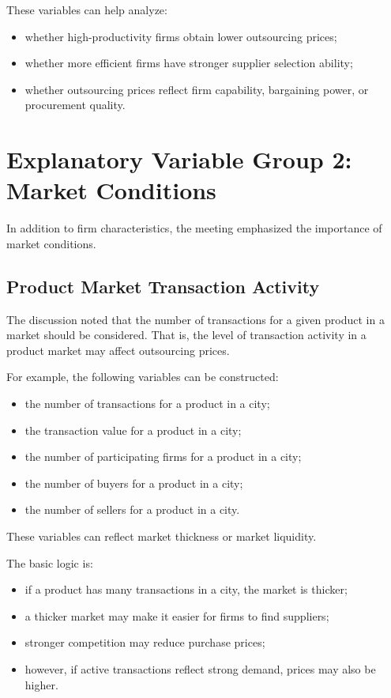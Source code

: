 \documentclass[11pt,a4paper]{article}
\begin{document}
These variables can help analyze:

\begin{itemize}
    \item whether high-productivity firms obtain lower outsourcing prices;
    \item whether more efficient firms have stronger supplier selection ability;
    \item whether outsourcing prices reflect firm capability, bargaining power, or procurement quality.
\end{itemize}

\section{Explanatory Variable Group 2: Market Conditions}

In addition to firm characteristics, the meeting emphasized the importance of market conditions.

\subsection{Product Market Transaction Activity}

The discussion noted that the number of transactions for a given product in a market should be considered. That is, the level of transaction activity in a product market may affect outsourcing prices.

For example, the following variables can be constructed:

\begin{itemize}
    \item the number of transactions for a product in a city;
    \item the transaction value for a product in a city;
    \item the number of participating firms for a product in a city;
    \item the number of buyers for a product in a city;
    \item the number of sellers for a product in a city.
\end{itemize}

These variables can reflect market thickness or market liquidity.

The basic logic is:

\begin{itemize}
    \item if a product has many transactions in a city, the market is thicker;
    \item a thicker market may make it easier for firms to find suppliers;
    \item stronger competition may reduce purchase prices;
    \item however, if active transactions reflect strong demand, prices may also be higher.
\end{itemize}
\end{document}
